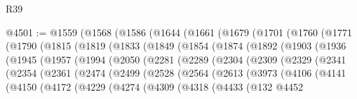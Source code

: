 \begin{lexlean}{R39}
\begin{coremodule}
@4501 := @1559
    (@1568
      (@1586
        (@1644
          (@1661
            (@1679
              (@1701
                (@1760
                  (@1771
                    (@1790
                      (@1815
                        (@1819
                          (@1833
                            (@1849
                              (@1854
                                (@1874
                                  (@1892
                                    (@1903
                                      (@1936
                                        (@1945
                                          (@1957
                                            (@1994
                                              (@2050
                                                (@2281
                                                  (@2289
                                                    (@2304
                                                      (@2309
                                                        (@2329
                                                          (@2341
                                                            (@2354
                                                              (@2361
                                                                (@2474
                                                                  (@2499
                                                                    (@2528
                                                                      (@2564
                                                                        (@2613
                                                                          (@3973
                                                                            (@4106
                                                                              (@4141
                                                                                (@4150
                                                                                  (@4172
                                                                                    (@4229
                                                                                      (@4274
                                                                                        (@4309
                                                                                          (@4318
                                                                                            (@4433
                                                                                              (@132
                                                                                                @4452

\end{coremodule}
\end{lexlean}
